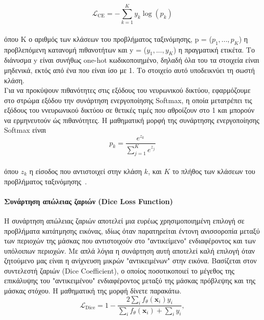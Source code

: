 \documentclass[12pt]{article}
\numberwithin{equation}{section}
\begin{document}
\begin{equation}
\mathcal{L}_{\text{CE}} = - \sum_{k=1}^{K} y_k \log(p_k)
\end{equation}\\

\noindent όπου K ο αριθμός των κλάσεων του προβλήματος ταξινόμησης, p = (\(p_1,...,p_K\)) η προβλεπόμενη κατανομή πιθανοτήτων και y = (\(y_1,...,y_K\)) η πραγματική ετικέτα. Το διάνυσμα y είναι συνήθως one-hot κωδικοποιημένο, δηλαδή όλα του τα στοιχεία είναι μηδενικά, εκτός από ένα που είναι ίσο με 1. Το στοιχείο αυτό υποδεικνύει τη σωστή κλάση.\\

Για να προκύψουν πιθανότητες στις εξόδους του νευρωνικού δικτύου, εφαρμόζουμε στο στρώμα εξόδου την συνάρτηση ενεργοποίησης Softmax, η οποία μετατρέπει τις εξόδους του ννευρωνικού δικτύου σε θετικές τιμές που αθροίζουν στο 1 και μπορούν να ερμηνευτούν ώς πιθανότητες. Η μαθηματική μορφή της συνάρτησης ενεργοποίησης Softmax είναι\\

\begin{equation}
p_k = \frac{e^{z_k}}{\sum_{j=1}^{K} e^{z_j}}
\end{equation}\\

\noindent όπου \(z_k\) η είσοδος που αντιστοιχεί στην κλάση \(k\), και \(K\) το πλήθος των κλάσεων του προβλήματος ταξινόμησης~\cite{hughes2024crossentropy}.\\


\paragraph{Συνάρτηση απώλειας ζαριών (Dice Loss Function)\\ [0.5 cm]}

Η συνάρτηση απώλειας ζαριών αποτελεί μια ευρέως χρησιμοποιημένη επιλογή σε προβλήματα κατάτμησης εικόνας, ιδίως όταν παρατηρείται έντονη ανισσοροπία μεταξύ των περιοχών της μάσκας που αντιστοιχούν στο "αντικείμενο" ενδιαφέροντος και των υπόλοιπων περιοχών. Με απλά λόγια η συνάρτηση αυτή αποτελεί καλή επιλογή όταν ζητούμενο μας είναι η ανίχνευση μικρών "αντικειμένων" στην εικόνα. Βασίζεται στον συντελεστή ζαριών (Dice Coefficient), ο οποίος ποσοτικοποιεί το μέγεθος της επικάλυψης του "αντικειμένου" ενδιαφέροντος μεταξύ της μάσκας πρόβλεψης και της μάσκας στόχου. Η μαθηματική της μορφή δίνετε παρακάτω.\\

\begin{equation}
\mathcal{L}_{\text{Dice}} = 1 - \frac{2 \sum_i f_\theta(\mathbf{x}_i) y_i}{\sum_i f_\theta(\mathbf{x}_i) + \sum_i y_i},
\end{equation}\\
\end{document}
